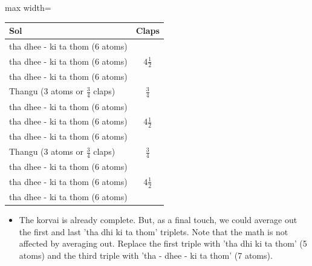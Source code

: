 \begin{center}
\begin{adjustbox}{max width=\textwidth}
\begin{tabular}{l c}
\toprule
Sol & Claps\\
\midrule
tha dhee - ki ta thom (6 atoms) & \multirow{3}{*}{$4\frac{1}{2}$}\\
tha dhee - ki ta thom (6 atoms) & \\
tha dhee - ki ta thom (6 atoms) & \\
Thangu ($3$ atoms or $\frac{3}{4}$ claps) & $\frac{3}{4}$\\
\midrule
tha dhee - ki ta thom (6 atoms) & \multirow{3}{*}{$4\frac{1}{2}$}\\
tha dhee - ki ta thom (6 atoms) & \\
tha dhee - ki ta thom (6 atoms) & \\
Thangu ($3$ atoms or $\frac{3}{4}$ claps) & $\frac{3}{4}$\\
\midrule
tha dhee - ki ta thom (6 atoms) & \multirow{3}{*}{$4\frac{1}{2}$}\\
tha dhee - ki ta thom (6 atoms) & \\
tha dhee - ki ta thom (6 atoms) & \\
\bottomrule
\end{tabular}
\end{adjustbox}
\end{center}

\begin{itemize}
  \item The korvai is already complete. But, as a final touch, we could average out
    the first and last 'tha dhi ki ta thom' triplets. Note that the math is not
    affected by averaging out. Replace the first triple with 'tha dhi ki ta thom' (5
    atoms) and the third triple with 'tha - dhee - ki ta thom' (7 atoms).
\end{itemize}

